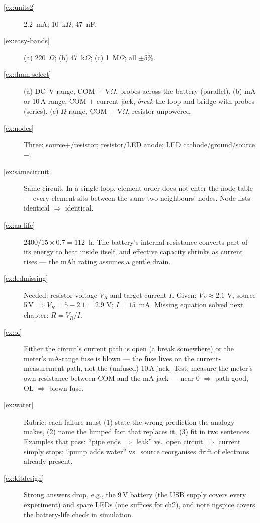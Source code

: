 \begin{description}
\item[\ref{ex:units2}] 2.2~mA; 10~k$\Omega$; 47~nF.
\item[\ref{ex:easy-bands}] (a) 220~$\Omega$; (b) 47~k$\Omega$;
(c) 1~M$\Omega$; all $\pm$5\%.
\item[\ref{ex:dmm-select}] (a) DC~V range, COM + V$\Omega$, probes across the
battery (parallel). (b) mA or 10\,A range, COM + current jack, \emph{break}
the loop and bridge with probes (series). (c) $\Omega$ range, COM +
V$\Omega$, resistor unpowered.
\item[\ref{ex:nodes}] Three: source$+$/resistor; resistor/LED anode; LED
cathode/ground/source$-$.
\item[\ref{ex:samecircuit}] Same circuit. In a single loop, element order does
not enter the node table — every element sits between the same two neighbours'
nodes. Node lists identical $\Rightarrow$ identical.
\item[\ref{ex:aa-life}] $2400/15 \times 0.7 = 112$~h. The battery's internal
resistance converts part of its energy to heat inside itself, and effective
capacity shrinks as current rises — the mAh rating assumes a gentle drain.
\item[\ref{ex:ledmissing}] Needed: resistor voltage $V_R$ and target current
$I$. Given: $V_F \approx 2.1$ V, source 5\,V $\Rightarrow V_R = 5-2.1=2.9$ V;
$I = 15$~mA. Missing equation solved next chapter: $R = V_R/I$.
\item[\ref{ex:ol}] Either the circuit's current path is open (a break
somewhere) or the meter's mA-range fuse is blown — the fuse lives on the
current-measurement path, not the (unfused) 10\,A jack. Test: measure the
meter's own resistance between COM and the mA jack — near 0 $\Rightarrow$
path good, OL $\Rightarrow$ blown fuse.
\item[\ref{ex:water}] Rubric: each failure must (1) state the wrong
prediction the analogy makes, (2) name the lumped fact that replaces it,
(3) fit in two sentences. Examples that pass: ``pipe ends $\Rightarrow$ leak''
vs.\ open circuit $\Rightarrow$ current simply stops; ``pump adds water'' vs.\
source reorganises drift of electrons already present.
\item[\ref{ex:kitdesign}] Strong answers drop, e.g., the 9\,V battery (the
USB supply covers every experiment) and spare LEDs (one suffices for ch2),
and note ngspice covers the battery-life check in simulation.
\end{description}

